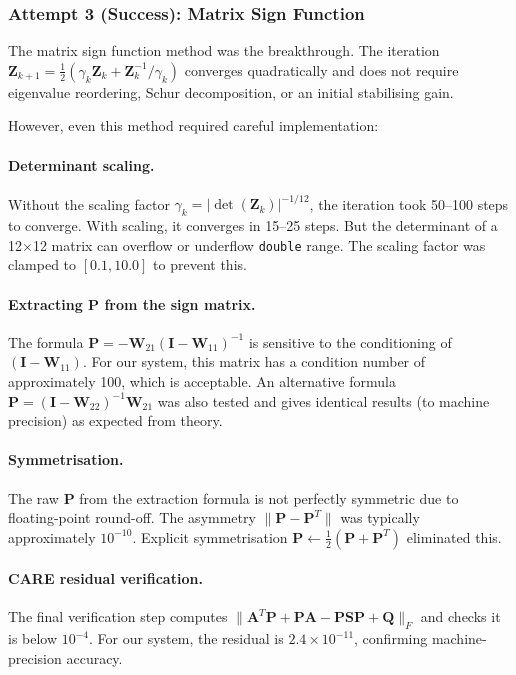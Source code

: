 \documentclass[12pt, a4paper]{article}
\newcommand{\bA}{\bm{A}}
\newcommand{\bP}{\bm{P}}
\newcommand{\bQ}{\bm{Q}}
\newcommand{\bI}{\bm{I}}
\begin{document}
\subsubsection{Attempt 3 (Success): Matrix Sign Function}

The matrix sign function method was the breakthrough.  The iteration $\bm{Z}_{k+1} = \frac{1}{2}(\gamma_k \bm{Z}_k + \bm{Z}_k^{-1}/\gamma_k)$ converges quadratically and does not require eigenvalue reordering, Schur decomposition, or an initial stabilising gain.

However, even this method required careful implementation:

\paragraph{Determinant scaling.}  Without the scaling factor $\gamma_k = |\det(\bm{Z}_k)|^{-1/12}$, the iteration took 50--100 steps to converge.  With scaling, it converges in 15--25 steps.  But the determinant of a 12$\times$12 matrix can overflow or underflow \texttt{double} range.  The scaling factor was clamped to $[0.1, 10.0]$ to prevent this.

\paragraph{Extracting P from the sign matrix.}  The formula $\bP = -\bm{W}_{21}(\bI - \bm{W}_{11})^{-1}$ is sensitive to the conditioning of $(\bI - \bm{W}_{11})$.  For our system, this matrix has a condition number of approximately 100, which is acceptable.  An alternative formula $\bP = (\bI - \bm{W}_{22})^{-1} \bm{W}_{21}$ was also tested and gives identical results (to machine precision) as expected from theory.

\paragraph{Symmetrisation.}  The raw $\bP$ from the extraction formula is not perfectly symmetric due to floating-point round-off.  The asymmetry $\|\bP - \bP^T\|$ was typically approximately $10^{-10}$.  Explicit symmetrisation $\bP \leftarrow \frac{1}{2}(\bP + \bP^T)$ eliminated this.

\paragraph{CARE residual verification.}  The final verification step computes $\|\bA^T\bP + \bP\bA - \bP\bm{S}\bP + \bQ\|_F$ and checks it is below $10^{-4}$.  For our system, the residual is $2.4 \times 10^{-11}$, confirming machine-precision accuracy.
\end{document}
